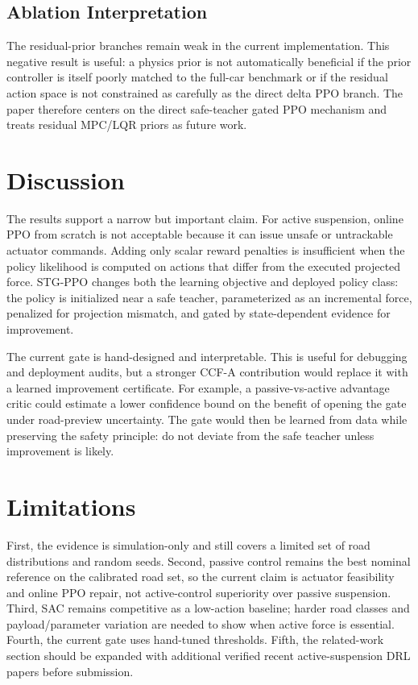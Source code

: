 \documentclass[letterpaper,twocolumn]{article}
\begin{document}
\subsection{Ablation Interpretation}

The residual-prior branches remain weak in the current implementation.
This negative result is useful: a physics prior is not automatically beneficial if the prior controller is itself poorly matched to the full-car benchmark or if the residual action space is not constrained as carefully as the direct delta PPO branch.
The paper therefore centers on the direct safe-teacher gated PPO mechanism and treats residual MPC/LQR priors as future work.

\section{Discussion}

The results support a narrow but important claim.
For active suspension, online PPO from scratch is not acceptable because it can issue unsafe or untrackable actuator commands.
Adding only scalar reward penalties is insufficient when the policy likelihood is computed on actions that differ from the executed projected force.
STG-PPO changes both the learning objective and deployed policy class: the policy is initialized near a safe teacher, parameterized as an incremental force, penalized for projection mismatch, and gated by state-dependent evidence for improvement.

The current gate is hand-designed and interpretable.
This is useful for debugging and deployment audits, but a stronger CCF-A contribution would replace it with a learned improvement certificate.
For example, a passive-vs-active advantage critic could estimate a lower confidence bound on the benefit of opening the gate under road-preview uncertainty.
The gate would then be learned from data while preserving the safety principle: do not deviate from the safe teacher unless improvement is likely.

\section{Limitations}

First, the evidence is simulation-only and still covers a limited set of road distributions and random seeds.
Second, passive control remains the best nominal reference on the calibrated road set, so the current claim is actuator feasibility and online PPO repair, not active-control superiority over passive suspension.
Third, SAC remains competitive as a low-action baseline; harder road classes and payload/parameter variation are needed to show when active force is essential.
Fourth, the current gate uses hand-tuned thresholds.
Fifth, the related-work section should be expanded with additional verified recent active-suspension DRL papers before submission.
\end{document}
